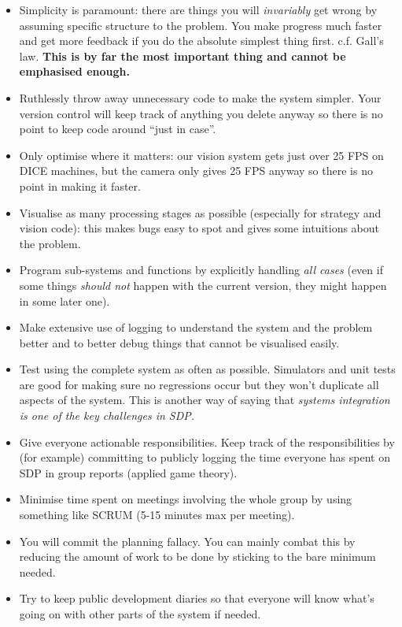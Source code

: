 \documentclass[12pt,a4paper,notitlepage,twocolumn]{report}
\begin{document}
\begin{itemize}
\item Simplicity is paramount: there are things you will
  \emph{invariably} get wrong by assuming specific structure to the
  problem. You make progress much faster and get more feedback if you
  do the absolute simplest thing first. c.f. Gall’s law. \textbf{This
    is by far the most important thing and cannot be emphasised
    enough.}
\item Ruthlessly throw away unnecessary code to make the system
  simpler. Your version control will keep track of anything you delete
  anyway so there is no point to keep code around “just in case”.
\item Only optimise where it matters: our vision system gets just over
  25 FPS on DICE machines, but the camera only gives 25 FPS anyway so
  there is no point in making it faster.
\item Visualise as many processing stages as possible (especially for
  strategy and vision code): this makes bugs easy to spot and gives
  some intuitions about the problem.
\item Program sub-systems and functions by explicitly handling
  \emph{all cases} (even if some things \emph{should not} happen with
  the current version, they might happen in some later one).
\item Make extensive use of logging to understand the system and the
  problem better and to better debug things that cannot be visualised
  easily.
\item Test using the complete system as often as possible. Simulators
  and unit tests are good for making sure no regressions occur but
  they won’t duplicate all aspects of the system. This is another way
  of saying that \emph{systems integration is one of the key
    challenges in SDP.}
\item Give everyone actionable responsibilities. Keep track of the
  responsibilities by (for example) committing to publicly logging the
  time everyone has spent on SDP in group reports (applied game
  theory).
\item Minimise time spent on meetings involving the whole group by
  using something like SCRUM (5-15 minutes max per meeting).
\item You will commit the planning fallacy. You can mainly combat this
  by reducing the amount of work to be done by sticking to the bare
  minimum needed.
\item Try to keep public development diaries so that everyone will
  know what’s going on with other parts of the system if needed.
\end{itemize}
\end{document}
